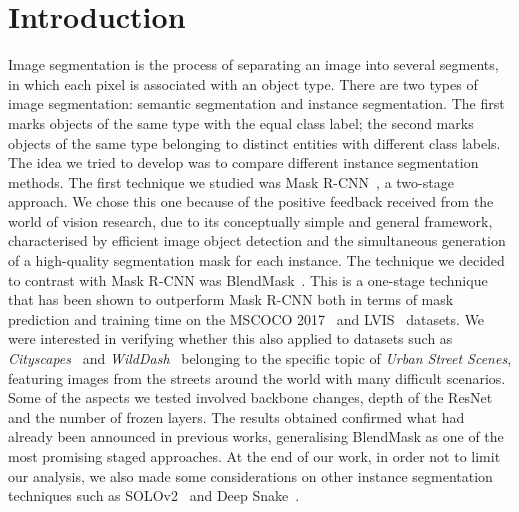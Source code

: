 \documentclass[10pt,twocolumn,letterpaper]{article}
\begin{document}
\section{Introduction}
Image segmentation is the process of separating an image into several segments, in which each pixel is associated with an object type. There are two types of image segmentation: semantic segmentation and instance segmentation. The first marks objects of the same type with the equal class label; the second marks objects of the same type belonging to distinct entities with different class labels. The idea we tried to develop was to compare different instance segmentation methods. The first technique we studied was Mask R-CNN~\cite{Authors1_maskrcnn}, a two-stage approach. We chose this one because of the positive feedback received from the world of vision research, due to its conceptually simple and general framework, characterised by efficient image object detection and the simultaneous generation of a high-quality segmentation mask for each instance. The technique we decided to contrast with Mask R-CNN was BlendMask~\cite{Authors2_BlendMask}. This is a one-stage technique that has been shown to outperform Mask R-CNN both in terms of mask prediction and training time on the MSCOCO 2017~\cite{Authors3_MSCOCO} and LVIS~\cite{Authors4_LVIS} datasets. We were interested in verifying whether this also applied to datasets such as \textit{Cityscapes}~\cite{cityscapes} and \textit{WildDash}~\cite{wildDash} belonging to the specific topic of \textit{Urban Street Scenes}, featuring images from the streets around the world with many difficult scenarios. Some of the aspects we tested involved backbone changes, depth of the ResNet~\cite{Authors5_ResNet} and the number of frozen layers. The results obtained confirmed what had already been announced in previous works, generalising BlendMask as one of the most promising staged approaches. At the end of our work, in order not to limit our analysis, we also made some considerations on other instance segmentation techniques such as SOLOv2~\cite{Authors6_SOLOv2} and Deep Snake~\cite{Authors7_deepsnake}.
\end{document}

